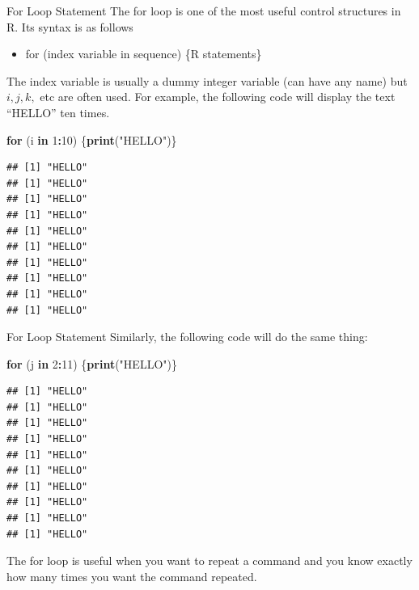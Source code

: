 \documentclass[
  ignorenonframetext,
]{beamer}
\newenvironment{Shaded}{\begin{snugshade}}{\end{snugshade}}
\newcommand{\ControlFlowTok}[1]{\textcolor[rgb]{0.13,0.29,0.53}{\textbf{#1}}}
\newcommand{\DecValTok}[1]{\textcolor[rgb]{0.00,0.00,0.81}{#1}}
\newcommand{\FunctionTok}[1]{\textcolor[rgb]{0.13,0.29,0.53}{\textbf{#1}}}
\newcommand{\NormalTok}[1]{#1}
\newcommand{\SpecialCharTok}[1]{\textcolor[rgb]{0.81,0.36,0.00}{\textbf{#1}}}
\newcommand{\StringTok}[1]{\textcolor[rgb]{0.31,0.60,0.02}{#1}}
\providecommand{\tightlist}{%
  \setlength{\itemsep}{0pt}\setlength{\parskip}{0pt}}
\begin{document}
\begin{frame}[fragile]{For Loop Statement}
\protect\hypertarget{for-loop-statement}{}
The for loop is one of the most useful control structures in R. Its
syntax is as follows

\begin{itemize}
\tightlist
\item
  for (index variable in sequence) \{R statements\}
\end{itemize}

The index variable is usually a dummy integer variable (can have any
name) but \(i, j, k,\) etc are often used. For example, the following
code will display the text ``HELLO'' ten times.

\tiny

\begin{Shaded}
\begin{Highlighting}[]
\ControlFlowTok{for}\NormalTok{ (i }\ControlFlowTok{in} \DecValTok{1}\SpecialCharTok{:}\DecValTok{10}\NormalTok{)}
\NormalTok{\{}\FunctionTok{print}\NormalTok{(}\StringTok{"HELLO"}\NormalTok{)\}}
\end{Highlighting}
\end{Shaded}

\begin{verbatim}
## [1] "HELLO"
## [1] "HELLO"
## [1] "HELLO"
## [1] "HELLO"
## [1] "HELLO"
## [1] "HELLO"
## [1] "HELLO"
## [1] "HELLO"
## [1] "HELLO"
## [1] "HELLO"
\end{verbatim}

\normalsize
\end{frame}

\begin{frame}[fragile]{For Loop Statement}
\protect\hypertarget{for-loop-statement-1}{}
Similarly, the following code will do the same thing:

\tiny

\begin{Shaded}
\begin{Highlighting}[]
\ControlFlowTok{for}\NormalTok{ (j }\ControlFlowTok{in} \DecValTok{2}\SpecialCharTok{:}\DecValTok{11}\NormalTok{)}
\NormalTok{\{}\FunctionTok{print}\NormalTok{(}\StringTok{"HELLO"}\NormalTok{)\}}
\end{Highlighting}
\end{Shaded}

\begin{verbatim}
## [1] "HELLO"
## [1] "HELLO"
## [1] "HELLO"
## [1] "HELLO"
## [1] "HELLO"
## [1] "HELLO"
## [1] "HELLO"
## [1] "HELLO"
## [1] "HELLO"
## [1] "HELLO"
\end{verbatim}

\normalsize

The for loop is useful when you want to repeat a command and you know
exactly how many times you want the command repeated.
\end{frame}
\end{document}
